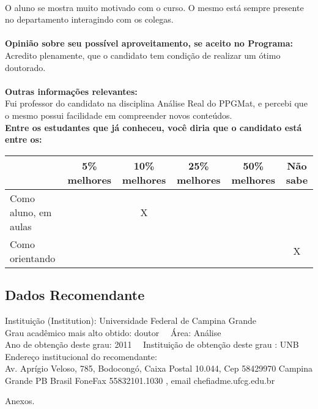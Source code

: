 \documentclass[11pt]{article}
\begin{document}
\\O aluno se mostra muito motivado com o curso. O mesmo está sempre presente no departamento interagindo com os colegas. \\
\\
\textbf{Opinião sobre seu possível aproveitamento, se aceito no Programa:}
\\Acredito plenamente, que o candidato tem condição de realizar um ótimo doutorado.  \\ 
\\
\textbf{Outras informações relevantes:} \\Fui professor do candidato na disciplina Análise Real do PPGMat, e percebi que o mesmo possui facilidade em compreender novos conteúdos. 
\\[0.3cm]
\textbf{Entre os estudantes que já conheceu, você diria que o candidato está entre os:}
\\
\begin{tabular}{|l|c|c|c|c|c|}
\hline
 & 5\% melhores & 10\% melhores & 25\% melhores & 50\% melhores & Não sabe \\
\hline
Como aluno, em aulas &  & X &  &  & \\
\hline
Como orientando &  &  &  &  & X\\
\hline
\end{tabular}
\subsection*{Dados Recomendante} 
	Instituição (Institution): Universidade Federal de Campina Grande
\\ 
	Grau acadêmico mais alto obtido: doutor
	\ \ Área: Análise
	\\
	Ano de obtenção deste grau: 2011
	\ \ 
	Instituição de obtenção deste grau : UNB
	\\ 
	Endereço institucional do recomendante: \\ Av. Aprígio Veloso, 785, Bodocongó, Caixa Postal 10.044,
Cep 58429970  Campina Grande  PB  Brasil
FoneFax 55832101.1030 , email chefiadme.ufcg.edu.br  
\begin{center}
Anexos.
\end{center}
\end{document}
